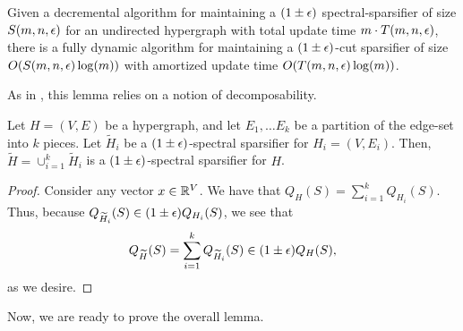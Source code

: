 \documentclass{article}
\begin{document}
\begin{lemma}\label{lem:decToDynamic}\cite{ADKKP16}
    Given a decremental algorithm for maintaining a $(1 \pm \epsilon)$ spectral-sparsifier of size $S(m, n, \epsilon)$ for an undirected hypergraph with total update time $m \cdot T(m, n, \epsilon)$, there is a fully dynamic algorithm for maintaining a $(1 \pm \epsilon)$-cut sparsifier of size $O(S(m, n, \epsilon) \log(m))$ with amortized update time $O(T(m, n , \epsilon)\log(m))$.
\end{lemma}

As in \cite{ADKKP16}, this lemma relies on a notion of decomposability. 

\begin{claim}
    Let $H = (V, E)$ be a hypergraph, and let $E_1, \dots E_k$ be a partition of the edge-set into $k$ pieces. Let $\widetilde{H}_i$ be a $(1 \pm \epsilon)$-spectral sparsifier for $H_i = (V, E_i)$. Then, $\widetilde{H} = \cup_{i = 1}^k \widetilde{H}_i$ is a $(1 \pm \epsilon)$-spectral sparsifier for $H$. 
\end{claim}

\begin{proof}
    Consider any vector $x \in \mathbb{R}^V$. We have that $Q_H(S) = \sum_{i = 1}^k Q_{H_i}(S)$. Thus, because $Q_{\widetilde{H}_i}(S) \in (1 \pm \epsilon) Q_{H_i}(S)$, we see that 
    \[
    Q_{\widetilde{H}}(S)  = \sum_{i = 1}^k Q_{\widetilde{H}_i}(S) \in (1 \pm \epsilon) Q_H(S),
    \]
    as we desire.
\end{proof}

Now, we are ready to prove the overall lemma.
\end{document}
